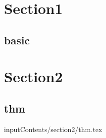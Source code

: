 \section{Section1}
    \subsection{basic}

\section{Section2}
    \subsection{thm}
        input{Contents/section2/thm.tex}